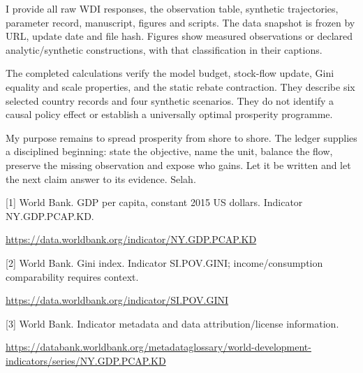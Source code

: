 \documentclass[10pt]{article}
\begin{document}
I provide all raw WDI responses, the observation table, synthetic trajectories, parameter record, manuscript, figures and scripts. The data snapshot is frozen by URL, update date and file hash. Figures show measured observations or declared analytic/synthetic constructions, with that classification in their captions.\par
The completed calculations verify the model budget, stock-flow update, Gini equality and scale properties, and the static rebate contraction. They describe six selected country records and four synthetic scenarios. They do not identify a causal policy effect or establish a universally optimal prosperity programme.\par
My purpose remains to spread prosperity from shore to shore. The ledger supplies a disciplined beginning: state the objective, name the unit, balance the flow, preserve the missing observation and expose who gains. Let it be written and let the next claim answer to its evidence. Selah.\par
{\small [1] World Bank. GDP per capita, constant 2015 US dollars. Indicator NY.GDP.PCAP.KD.\par\url{https://data.worldbank.org/indicator/NY.GDP.PCAP.KD}\par}
{\small [2] World Bank. Gini index. Indicator SI.POV.GINI; income/consumption comparability requires context.\par\url{https://data.worldbank.org/indicator/SI.POV.GINI}\par}
{\small [3] World Bank. Indicator metadata and data attribution/license information.\par\url{https://databank.worldbank.org/metadataglossary/world-development-indicators/series/NY.GDP.PCAP.KD}\par}
\end{document}
